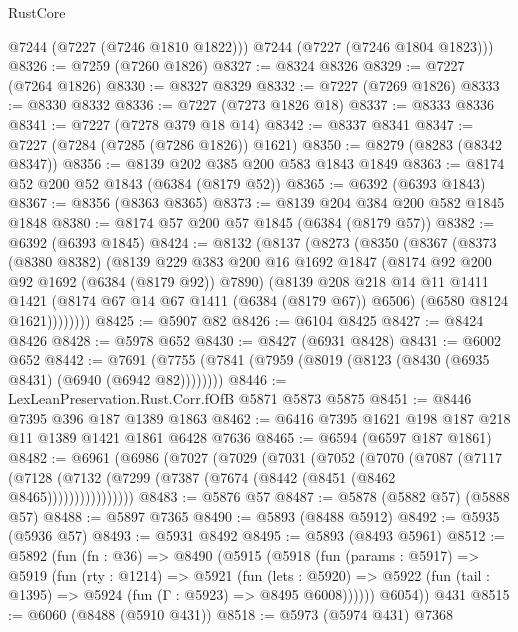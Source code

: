\begin{lexlean}{RustCore}
\begin{coremodule}
        @7244
        (@7227 (@7246 @1810 @1822)))
      @7244
      (@7227 (@7246 @1804 @1823)))
@8326 := @7259 (@7260 @1826)
@8327 := @8324 @8326
@8329 := @7227 (@7264 @1826)
@8330 := @8327 @8329
@8332 := @7227 (@7269 @1826)
@8333 := @8330 @8332
@8336 := @7227 (@7273 @1826 @18)
@8337 := @8333 @8336
@8341 := @7227 (@7278 @379 @18 @14)
@8342 := @8337 @8341
@8347 := @7227 (@7284 (@7285 (@7286 @1826)) @1621)
@8350 := @8279 (@8283 (@8342 @8347))
@8356 := @8139 @202 @385 @200 @583 @1843 @1849
@8363 := @8174 @52 @200 @52 @1843 (@6384 (@8179 @52))
@8365 := @6392 (@6393 @1843)
@8367 := @8356 (@8363 @8365)
@8373 := @8139 @204 @384 @200 @582 @1845 @1848
@8380 := @8174 @57 @200 @57 @1845 (@6384 (@8179 @57))
@8382 := @6392 (@6393 @1845)
@8424 := @8132
    (@8137
      (@8273
        (@8350
          (@8367
            (@8373
              (@8380 @8382)
              (@8139
                @229
                @383
                @200
                @16
                @1692
                @1847
                (@8174 @92 @200 @92 @1692 (@6384 (@8179 @92)) @7890)
                (@8139
                  @208
                  @218
                  @14
                  @11
                  @1411
                  @1421
                  (@8174 @67 @14 @67 @1411 (@6384 (@8179 @67)) @6506)
                  (@6580 @8124 @1621))))))))
@8425 := @5907 @82
@8426 := @6104 @8425
@8427 := @8424 @8426
@8428 := @5978 @652
@8430 := @8427 (@6931 @8428)
@8431 := @6002 @652
@8442 := @7691 (@7755 (@7841 (@7959 (@8019 (@8123 (@8430 (@6935 @8431) (@6940 (@6942 @82))))))))
@8446 := LexLeanPreservation.Rust.Corr.fOfB @5871 @5873 @5875
@8451 := @8446 @7395 @396 @187 @1389 @1863
@8462 := @6416 @7395 @1621 @198 @187 @218 @11 @1389 @1421 @1861 @6428 @7636
@8465 := @6594 (@6597 @187 @1861)
@8482 := @6961
    (@6986
      (@7027
        (@7029
          (@7031
            (@7052
              (@7070
                (@7087
                  (@7117
                    (@7128 (@7132 (@7299 (@7387 (@7674 (@8442 (@8451 (@8462 @8465))))))))))))))))
@8483 := @5876 @57
@8487 := @5878 (@5882 @57) (@5888 @57)
@8488 := @5897 @7365
@8490 := @5893 (@8488 @5912)
@8492 := @5935 (@5936 @57)
@8493 := @5931 @8492
@8495 := @5893 (@8493 @5961)
@8512 := @5892
    (fun (fn : @36) =>
    @8490
      (@5915
        (@5918
          (fun (params : @5917) =>
          @5919
            (fun (rty : @1214) =>
            @5921
              (fun (lets : @5920) =>
              @5922 (fun (tail : @1395) => @5924 (fun (Γ : @5923) => @8495 @6008))))))
        @6054))
    @431
@8515 := @6060 (@8488 (@5910 @431))
@8518 := @5973 (@5974 @431) @7368

\end{coremodule}
\end{lexlean}
